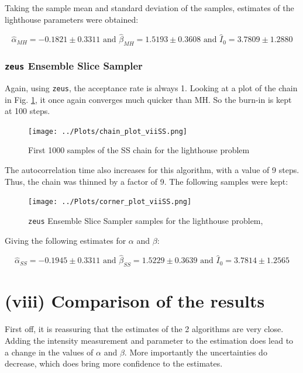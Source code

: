 \documentclass[12pt]{report} %
\begin{document}
Taking the sample mean and standard deviation of the samples, estimates of the lighthouse parameters were obtained:

\begin{equation}
    \hat{\alpha}_{MH} = -0.1821 \pm 0.3311 \text{ and } \hat{\beta}_{MH} = 1.5193 \pm 0.3608 \text{ and } \hat{I}_{0} = 3.7809 \pm 1.2880
\end{equation}

\subsubsection*{\texttt{zeus} Ensemble Slice Sampler}

Again, using \texttt{zeus}, the acceptance rate is always 1. Looking at a plot of the chain in Fig. \ref{fig:SS_convergence_vii}, it once again converges much quicker than MH. So the burn-in is kept at 100 steps.


\begin{figure}[h]
    \centering
    \texttt{[image: ../Plots/chain\_plot\_viiSS.png]}
    \caption{First 1000 samples of the SS chain for the lighthouse problem}
    \label{fig:SS_convergence_vii}
    \end{figure}

The autocorrelation time also increases for this algorithm, with a value of 9 steps. Thus, the chain was thinned by a factor of 9. The following samples were kept:

\newpage

\begin{figure}[h]
\centering
\texttt{[image: ../Plots/corner\_plot\_viiSS.png]}
\caption{\texttt{zeus} Ensemble Slice Sampler samples for the lighthouse problem, }
\label{fig:SS_samples_vii}
\end{figure}

Giving the following estimates for $\alpha$ and $\beta$:

\begin{equation}
    \hat{\alpha}_{SS} = -0.1945 \pm 0.3311 \text{ and } \hat{\beta}_{SS} = 1.5229 \pm 0.3639 \text{ and } \hat{I}_{0} = 3.7814 \pm 1.2565
\end{equation}


\section*{(viii) Comparison of the results}

First off, it is reassuring that the estimates of the 2 algorithms are very close. Adding the intensity measurement and parameter to the estimation does lead to a change in the values of $\alpha$ and $\beta$. More importantly the uncertainties do decrease, which does bring more confidence to the estimates.



\end{document}
